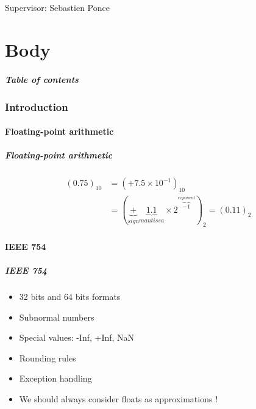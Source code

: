 \documentclass{beamer}
\begin{document}
\begin{frame}
    \maketitle

    Supervisor: Sebastien Ponce
\end{frame}

\part{Body}

\begin{frame}
    \frametitle{Table of contents}
    \tableofcontents
\end{frame}

\section{Introduction}

\begin{frame}
    \tableofcontents[currentsection]
\end{frame}

\subsection{Floating-point arithmetic}

\begin{frame}
    \frametitle{Floating-point arithmetic}

    \begin{displaymath}
        \begin{split}
            (0.75)_{10} & = (+ 7.5 \times 10^{-1})_{10} \\
            & = (\underbrace{+}_{sign} \underbrace{1.1}_{mantissa} \times 2^{\overbrace{-1}^{exponent}})_{2} = (0.11)_{2}
        \end{split}
    \end{displaymath}
\end{frame}

\subsection{IEEE 754}

\begin{frame}
    \frametitle{IEEE 754}

    \begin{itemize}
        \item 32 bits and 64 bits formats
        \item Subnormal numbers
        \item Special values: -Inf, +Inf, NaN
        \item Rounding rules
        \item Exception handling
        \item We should always consider floats as approximations !
    \end{itemize}
\end{frame}
\end{document}
